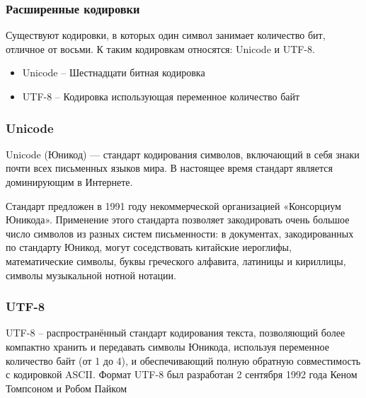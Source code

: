 \documentclass[14pt]{beamer}
\begin{document}
  
\begin{frame}
\frametitle{\small Расширенные кодировки}

Существуют кодировки, в которых один символ занимает количество бит, отличное от восьми.
К таким кодировкам относятся: Unicode и UTF-8.
\begin{itemize}

\item Unicode -- Шестнадцати битная кодировка

\item UTF-8 -- Кодировка использующая переменное количество байт
\end{itemize}

\end{frame}



\begin{frame}
\frametitle{\small Unicode}

Unicode (Юникод) — стандарт кодирования символов, включающий в себя знаки почти всех письменных языков мира. В настоящее время стандарт является доминирующим в Интернете.

\small Стандарт предложен в 1991 году некоммерческой организацией «Консорциум Юникода». Применение этого стандарта позволяет закодировать очень большое число символов из разных систем письменности: в документах, закодированных по стандарту Юникод, могут соседствовать китайские иероглифы, математические символы, буквы греческого алфавита, латиницы и кириллицы, символы музыкальной нотной нотации.







\end{frame}





\begin{frame}
\frametitle{\small UTF-8}


UTF-8 -- распространённый стандарт кодирования текста, позволяющий более компактно хранить и передавать символы Юникода, используя переменное количество байт (от 1 до 4), и обеспечивающий полную обратную совместимость с кодировкой ASCII. Формат UTF-8 был разработан 2 сентября 1992 года Кеном Томпсоном и Робом Пайком

\end{frame}
\end{document}
